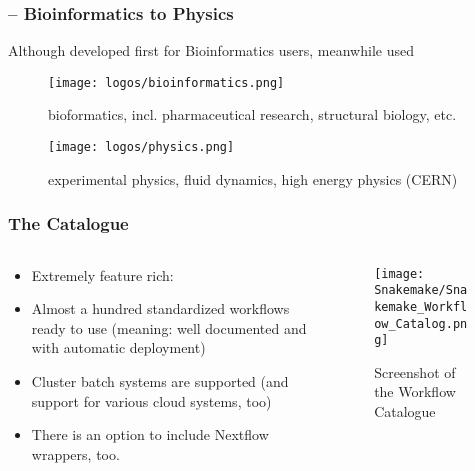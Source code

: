\begin{frame}
	\frametitle{\Snakemake -- Bioinformatics to Physics}
	Although developed first for Bioinformatics users, meanwhile used 
	\begin{figure}[ht]
		\begin{minipage}[b]{0.45\linewidth}
			\centering
			\vspace{-1em}
			\texttt{[image: logos/bioinformatics.png]}
			\vspace{0.5em}
			\caption*{bioformatics, incl. pharmaceutical research, structural biology, etc.}
			\label{fig:a}
		\end{minipage}
		\hspace{0.5cm}
		\begin{minipage}[b]{0.45\linewidth}
			\centering
			\vspace{-0.8em}
			\texttt{[image: logos/physics.png]}
			\vspace{0.5em}
			\caption*{experimental physics, fluid dynamics, high energy physics (CERN)}
			\label{fig:b}
		\end{minipage}
	\end{figure}
\end{frame}


\begin{frame}
	\frametitle{The \Snakemake{} Catalogue}
	\begin{columns}
		\begin{column}{0.5\textwidth}
			\begin{itemize}[<+->]
				\item Extremely feature rich: 
				\item Almost a hundred standardized workflows ready to use (meaning: well documented and with automatic deployment)
				\item Cluster batch systems are supported (and support for various cloud systems, too)
				\item There is an option to include Nextflow wrappers, too.
			\end{itemize}
		\end{column}
		\begin{column}{0.5\textwidth}
			\begin{figure}
				\texttt{[image: Snakemake/Snakemake\_Workflow\_Catalog.png]}
				\vspace{0.5em}
				\caption*{Screenshot of the Workflow Catalogue}
			\end{figure}
		\end{column}
	\end{columns}
\end{frame}

